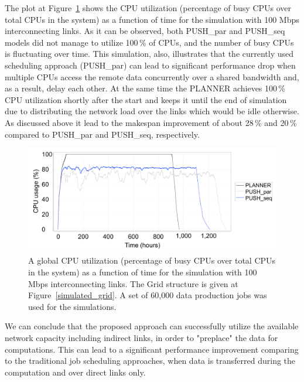 \documentclass{svjour3}                     %
\begin{document}
The plot at Figure~\ref{multi_cpu_consumption} shows the CPU utilization (percentage of busy CPUs over total CPUs in the system) as a function of time for the simulation with 100 Mbps interconnecting links. As it can be observed, both PUSH\_par and PUSH\_seq models did not manage to utilize 100\,\% of CPUs, and the number of busy CPUs is fluctuating over time. This simulation, also, illustrates that the currently used scheduling approach (PUSH\_par) can lead to significant performance drop when multiple CPUs access the remote data concurrently over a shared bandwidth and, as a result, delay each other. At the same time the PLANNER achieves 100\,\% CPU utilization shortly after the start and keeps it until the end of simulation due to distributing the network load over the links which would be idle otherwise. As discussed above it lead to the makespan improvement of about 28\,\% and 20\,\% compared to PUSH\_par and PUSH\_seq, respectively.
\begin{figure}
  \begin{center}
    \includegraphics [trim= 0mm 00mm 0mm 00mm , clip,width=1\textwidth]{3models_link01.png}
    \caption{A global CPU utilization (percentage of busy CPUs over total CPUs in the system) as a function of time for the simulation with 100 Mbps interconnecting links. The Grid structure is given at Figure~\ref{simulated_grid}. A set of 60,000 data production jobs was used for the simulations.}
      \label{multi_cpu_consumption}	
  \end{center}  
\end{figure}

We can conclude that the proposed approach can successfully utilize the available network capacity including indirect links, in order to "preplace" the data for computations. This can lead to a significant performance improvement comparing to the traditional job scheduling approaches, when data is transferred during the computation and over direct links only. 
\end{document}
